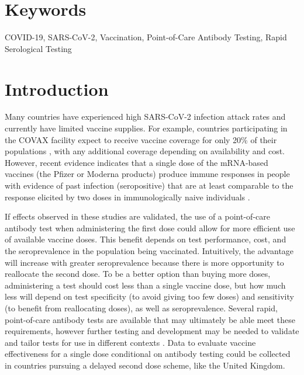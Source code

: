 \documentclass[10pt,a4paper,twocolumn]{article}
\begin{document}
\section*{Keywords}

COVID-19, SARS-CoV-2, Vaccination, Point-of-Care Antibody Testing, Rapid Serological Testing

\clearpage


\section*{Introduction}

Many countries have experienced high SARS-CoV-2 infection attack rates and currently have limited vaccine supplies. For example, countries participating in the COVAX facility expect to receive vaccine coverage for only 20\% of their populations \cite{noauthor_gavi_nodate}, with any additional coverage depending on availability and cost. However, recent evidence indicates that a single dose of the mRNA-based vaccines (\eg* the Pfizer or Moderna products) produce immune responses in people with evidence of past infection (\ie* seropositive) that are at least comparable to the response elicited by two doses in immunologically naive individuals \cite{krammer_antibody_2021,stamatatos_mrna_2021,samanovic_poor_2021,saadat_binding_2021,lustig_neutralizing_2021}.

If effects observed in these studies are validated, the use of a point-of-care antibody test when administering the first dose could allow for more efficient use of available vaccine doses. This benefit depends on test performance, cost, and the seroprevalence in the population being vaccinated. Intuitively, the advantage will increase with greater seroprevalence because there is more opportunity to reallocate the second dose. To be a better option than buying more doses, administering a test should cost less than a single vaccine dose, but how much less will depend on test specificity (to avoid giving too few doses) and sensitivity (to benefit from reallocating doses), as well as seroprevalence. Several rapid, point-of-care antibody tests \cite{baraniuk_covid-19_2020,mathur_antibody_2020,shuren_fdas_2021,prazuck_evaluation_2021} are available that may ultimately be able meet these requirements, however further testing and development may be needed to validate and tailor tests for use in different contexts \cite{ndaye_challenges_2021,tso_high_2021,emmerich_limited_2021}. Data to evaluate vaccine effectiveness for a single dose conditional on antibody testing could be collected in countries pursuing a delayed second dose scheme, like the United Kingdom.
\end{document}
